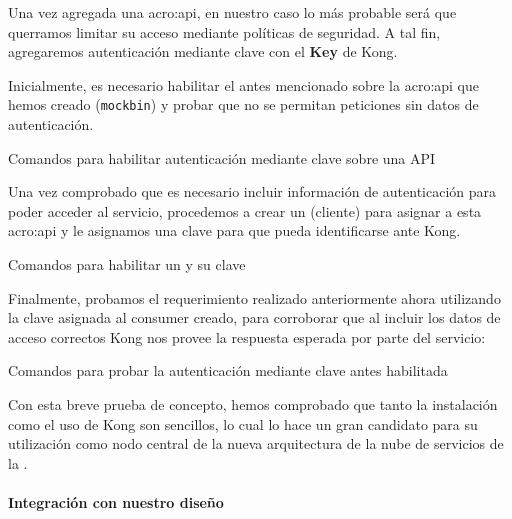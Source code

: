 Una vez agregada una \gls{acro:api}, en nuestro caso lo más probable será que querramos limitar su acceso mediante políticas de seguridad. A tal fin, agregaremos autenticación mediante clave con el  \textbf{Key} de Kong.

Inicialmente, es necesario habilitar el  antes mencionado sobre la \gls{acro:api} que hemos creado (\texttt{mockbin}) y probar que no se permitan peticiones sin datos de autenticación.

\begin{listing}[H]
  \caption{Comandos para habilitar autenticación mediante clave sobre una API}
  \label{soa:tecnologias:kong:bash-probar-sin-auth}
\end{listing}

Una vez comprobado que es necesario incluir información de autenticación para poder acceder al servicio, procedemos a crear un  (cliente) para asignar a esta \gls{acro:api} y le asignamos una clave para que pueda identificarse ante Kong.

\begin{listing}[H]
  \caption{Comandos para habilitar un  y su clave}
  \label{soa:tecnologias:kong:bash-habilitar-key-auth}
\end{listing}

Finalmente, probamos el requerimiento realizado anteriormente ahora utilizando la clave asignada al consumer creado, para corroborar que al incluir los datos de acceso correctos Kong nos provee la respuesta esperada por parte del servicio:

\begin{listing}[H]
  \caption{Comandos para probar la autenticación mediante clave antes habilitada}
  \label{soa:tecnologias:kong:bash-probar-key-auth}
\end{listing}


Con esta breve prueba de concepto, hemos comprobado que tanto la instalación como el uso de Kong son sencillos, lo cual lo hace un gran candidato para su utilización como nodo central de la nueva arquitectura de la nube de servicios de la {\unlp}.

\paragraph{Integración con nuestro diseño}

